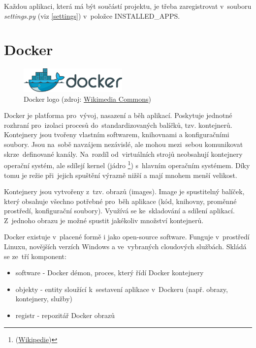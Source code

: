 Každou aplikaci, která má být součástí projektu, je třeba
zaregistrovat v~souboru \textit{settings.py} (viz \ref{settings}) v~položce 
\textsf{INSTALLED\_APPS}.

\newpage
\section{Docker}
\label{docker}

\begin{figure}[H] \centering
      \includegraphics[width=150pt]{./pictures/Docker_(container_engine)_logo.png}
      \caption[Docker logo]{Docker logo (zdroj:
\href{https://commons.wikimedia.org/wiki/File:Docker_(container_engine)_logo.png}{Wikimedia Commons})}
      \label{fig:docker}
  \end{figure}
  
Docker je platforma pro~vývoj, nasazení a běh aplikací. Poskytuje
jednotné rozhraní pro~izolaci procesů do~standardizovaných balíčků,
tzv. kontejnerů. Kontej\-nery jsou tvořeny vlastním softwarem,
knihovnami a konfiguračními soubory. Jsou na~sobě navzájem nezávislé,
ale mohou mezi~sebou komunikovat skrze~definované kanály. Na~rozdíl 
od~virtuálních strojů neobsahují kontejnery operační systém, ale sdílejí
kernel (jádro \footnote{(\href{https://cs.wikipedia.org/wiki/Jádro_operačního_systému}{Wikipedie})}) s~hlavním operačním systémem. Díky tomu je režie při~jejich
spuštění výrazně nižší a mají mnohem menší velikost. \cite{docker-book}

Kontejnery jsou vytvořeny z~tzv. obrazů (images). Image je spustitelný
balíček, který obsahuje všechno potřebné pro~běh aplikace (kód,
knihovny, proměnné pro\-středí, konfigurační soubory). Využívá se ke~skladování 
a sdílení aplikací. Z~jednoho obrazu je možné spustit
jakékoliv množství kontejnerů. \cite{docker-doc}

Docker existuje v~placené formě i jako open-source software. Funguje 
v~prostředí Linuxu, novějších verzích Windows a ve~vybraných cloudových
službách. \cite{docker-doc} Skládá se ze~tří komponent:

\begin{itemize}
\item software - Docker démon, proces, který řídí Docker kontejnery
\item objekty - entity sloužící k~sestavení aplikace v~Dockeru (např. obrazy, kontejnery, služby)
\item registr - repozitář Docker obrazů
\end{itemize}

